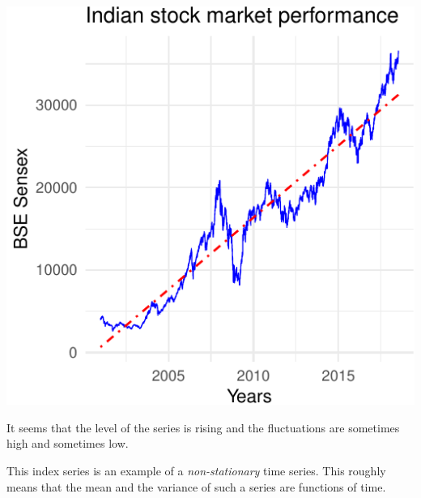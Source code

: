 \documentclass[11pt,]{article}
\begin{document}
\begin{center}\includegraphics{FMC_T4_PhD_Fin_Time_Series_files/figure-latex/BSE-2} \end{center}

It seems that the level of the series is rising and the fluctuations are
sometimes high and sometimes low.

This index series is an example of a \emph{non-stationary} time series.
This roughly means that the mean and the variance of such a series are
functions of time.
\end{document}
